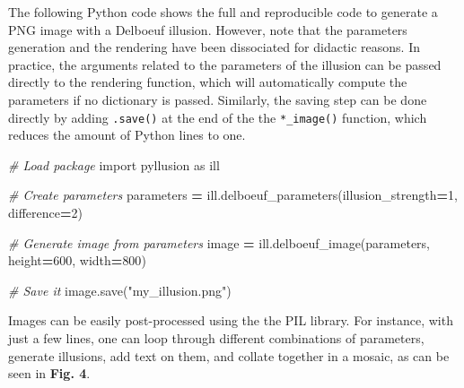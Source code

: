 \documentclass[
  english,
  man,floatsintext]{apa6}
\newenvironment{Shaded}{\begin{snugshade}}{\end{snugshade}}
\newcommand{\CommentTok}[1]{\textcolor[rgb]{0.56,0.35,0.01}{\textit{#1}}}
\newcommand{\DecValTok}[1]{\textcolor[rgb]{0.00,0.00,0.81}{#1}}
\newcommand{\ImportTok}[1]{#1}
\newcommand{\NormalTok}[1]{#1}
\newcommand{\OperatorTok}[1]{\textcolor[rgb]{0.81,0.36,0.00}{\textbf{#1}}}
\newcommand{\StringTok}[1]{\textcolor[rgb]{0.31,0.60,0.02}{#1}}
\begin{document}
The following Python code shows the full and reproducible code to generate a PNG image with a Delboeuf illusion. However, note that the parameters generation and the rendering have been dissociated for didactic reasons. In practice, the arguments related to the parameters of the illusion can be passed directly to the rendering function, which will automatically compute the parameters if no dictionary is passed. Similarly, the saving step can be done directly by adding \texttt{.save()} at the end of the the \texttt{*\_image()} function, which reduces the amount of Python lines to one.

\begin{Shaded}
\begin{Highlighting}[]
\CommentTok{\# Load package}
\ImportTok{import}\NormalTok{ pyllusion }\ImportTok{as}\NormalTok{ ill}

\CommentTok{\# Create parameters}
\NormalTok{parameters }\OperatorTok{=}\NormalTok{ ill.delboeuf\_parameters(illusion\_strength}\OperatorTok{=}\DecValTok{1}\NormalTok{, difference}\OperatorTok{=}\DecValTok{2}\NormalTok{)}

\CommentTok{\# Generate image from parameters}
\NormalTok{image }\OperatorTok{=}\NormalTok{ ill.delboeuf\_image(parameters, height}\OperatorTok{=}\DecValTok{600}\NormalTok{, width}\OperatorTok{=}\DecValTok{800}\NormalTok{)}

\CommentTok{\# Save it}
\NormalTok{image.save(}\StringTok{"my\_illusion.png"}\NormalTok{)}
\end{Highlighting}
\end{Shaded}

Images can be easily post-processed using the the PIL library. For instance, with just a few lines, one can loop through different combinations of parameters, generate illusions, add text on them, and collate together in a mosaic, as can be seen in \textbf{Fig. 4}.
\end{document}
